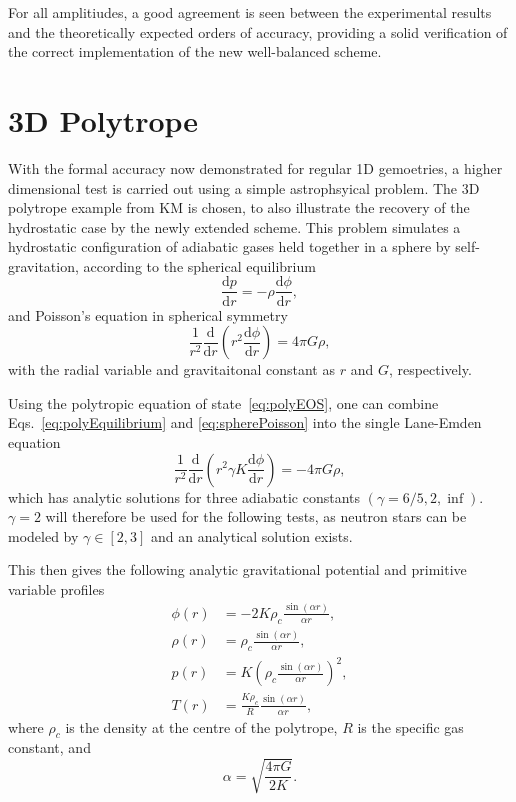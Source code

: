 For all amplitiudes, a good agreement is seen between the experimental results and the theoretically expected orders of accuracy, providing a solid verification of the correct implementation of the new well-balanced scheme.


\section{3D Polytrope}
\label{sec:polytrope}

With the formal accuracy now demonstrated for regular 1D gemoetries, a higher dimensional test is carried out using a simple astrophsyical problem. The 3D polytrope example from KM is chosen, to also illustrate the recovery of the hydrostatic case by the newly extended scheme. This problem simulates a hydrostatic configuration of adiabatic gases held together in a sphere by self-gravitation, according to the spherical equilibrium
\begin{equation} \label{eq:polyEquilibrium}
\frac{\textrm{d}p}{\textrm{d}r}=-\rho\frac{\textrm{d}\phi}{\textrm{d}r},
\end{equation}
and Poisson's equation in spherical symmetry
\begin{equation} \label{eq:spherePoisson}
\frac{1}{r^2}\frac{\textrm{d}}{\textrm{d}r}\left(r^2\frac{\textrm{d}\phi}{\textrm{d}r}\right)=4\pi G\rho,
\end{equation}
with the radial variable and gravitaitonal constant as $r$ and $G$, respectively.

Using the polytropic equation of state~\eqref{eq:polyEOS}, one can combine Eqs.~\eqref{eq:polyEquilibrium} and \eqref{eq:spherePoisson} into the single Lane-Emden equation
\begin{equation}
\frac{1}{r^2}\frac{\textrm{d}}{\textrm{d}r}\left(r^2\gamma K\frac{\textrm{d}\phi}{\textrm{d}r}\right)=-4\pi G\rho,
\end{equation}
which has analytic solutions for three adiabatic constants $(\gamma=6/5,2,\inf)$. $\gamma=2$ will therefore be used for the following tests, as neutron stars can be modeled by $\gamma\in[2,3]$ and an analytical solution exists.

This then gives the following analytic gravitational potential and primitive variable profiles
\begin{align}
\phi(r)&=-2K\rho_c\frac{\sin(\alpha r)}{\alpha r}, \\
\rho(r)&=\rho_c\frac{\sin(\alpha r)}{\alpha r}, \\
p(r)&=K\left(\rho_c\frac{\sin(\alpha r)}{\alpha r}\right)^2, \\
T(r)&=\frac{K\rho_c}{R}\frac{\sin(\alpha r)}{\alpha r},
\end{align}
where $\rho_c$ is the density at the centre of the polytrope, $R$ is the specific gas constant, and
\begin{equation}
\alpha=\sqrt{\frac{4\pi G}{2K}}.
\end{equation}

